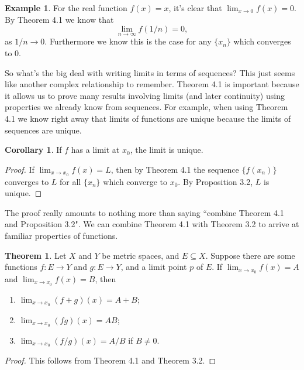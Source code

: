 \documentclass{article}
\theoremstyle{definition}
\newtheorem{theorem}{Theorem}[section]
\newtheorem{corollary}{Corollary}[section]
\newtheorem{example}{Example}[section]
\begin{document}
	\begin{example}
		For the real function $ f(x)=x $, it's clear that $ \lim_{x\to 0}f(x)=0 $. By Theorem 4.1 we know that $$ \lim\limits_{n\to\infty}f(1/n)=0,$$ as $ 1/n\to0 $. Furthermore we know this is the case for any $ \{x_n\} $ which converges to $ 0 $.  
	\end{example}
	So what's the big deal with writing limits in terms of sequences? This just seems like another complex relationship to remember. Theorem 4.1 is important because it allows us to prove many results involving limits (and later continuity) using properties we already know from sequences. For example, when using Theorem 4.1 we  know right away that limits of functions are unique because the limits of sequences are unique. 
	\begin{corollary}
		If $ f $ has a limit at $ x_0 $, the limit is unique.
	\end{corollary}
	\begin{proof}
		If $ \lim_{x\to x_0}f(x)=L $, then by Theorem 4.1 the sequence $ \{f(x_n)\} $ converges to $ L $ for all $ \{x_n\} $ which converge to $ x_0 $. By Proposition 3.2, $ L $ is unique. 
	\end{proof}
	The proof really amounts to nothing more than saying ``combine Theorem 4.1 and Proposition 3.2". We can combine Theorem 4.1 with Theorem 3.2 to arrive at familiar properties of functions. 
	\begin{theorem}
		Let $ X $ and $ Y $ be metric spaces, and $ E\subseteq X $. Suppose there are some functions $ f:E\to Y $ and $ g:E\to Y $, and a limit point $ p $ of $ E $. If $ \lim_{x\to x_0}f(x)=A $ and $ \lim_{x\to x_0}f(x)=B $, then
		\begin{enumerate}
			\item $ \lim_{x\to x_0}(f+g)(x)=A+B $;
			\item $ \lim_{x\to x_0}(fg)(x)=AB $;
			\item $ \lim_{x\to x_0}(f/g)(x)=A/B $ if $ B\neq 0 $.
		\end{enumerate}
	\end{theorem}
	\begin{proof}
		This follows from Theorem 4.1 and Theorem 3.2.
	\end{proof}
\end{document}
